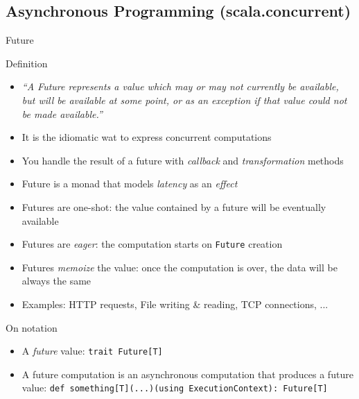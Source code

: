 \documentclass[presentation, 9pt]{beamer}\mode<presentation>{\usetheme{AMSBolognaFC}}
\begin{document}
\subsection{Asynchronous Programming (scala.concurrent)}
\begin{frame}[fragile]{Future}
	\begin{alertblock}{Definition}
		\centering
		\begin{itemize}
			\item \emph{``A Future represents a value which may or may not currently be available, but will be available at some point, or as an exception if that value could not be made available.''}
		\end{itemize}
	\end{alertblock}
\begin{itemize}
 \item It is the idiomatic wat to express concurrent computations
 \item You handle the result of a future with \emph{callback} and   \emph{transformation} methods
 \item Future is a monad that models \emph{latency} as an \emph{effect}
 \item Futures are one-shot: the value contained by a future will be eventually available
 \item Futures are \emph{eager}: the computation starts on \texttt{Future} creation
 \item Futures \emph{memoize} the value: once the computation is over, the data will be always the same
 \item Examples: HTTP requests, File writing \& reading, TCP connections, ...
\end{itemize}
\begin{alertblock}{On notation}
	\begin{itemize}
		\item A \emph{future} value: \texttt{trait Future[T]}
  	\item A future computation is an asynchronous computation that produces a future value: \texttt{def something[T](...)(using ExecutionContext): Future[T]}
	\end{itemize}
\end{alertblock}
\end{frame}
\end{document}
